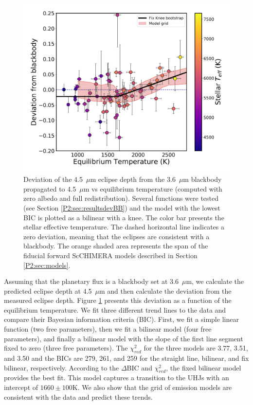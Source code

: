 \begin{figure}
    \centering
    \includegraphics[trim={0cm 0cm 0cm 0cm},clip,width=\linewidth]{devBBvsTeq_PHOENIX_intpl_fit+model_TiOVO_CO.pdf}
    \caption{Deviation of the 4.5~$\mu$m eclipse depth from the 3.6~$\mu$m blackbody propagated to 4.5~$\mu$m vs equilibrium temperature (computed with zero albedo and full redistribution). Several functions were tested (see Section \ref{P2:sec:resultsdevBB}) and  the model with the lowest BIC  is plotted as a bilinear with a knee. The color bar presents the stellar effective temperature. The dashed horizontal line indicates a zero deviation, meaning that the eclipses are consistent with a blackbody. The orange shaded area represents the span of the fiducial forward ScCHIMERA models described in Section \ref{P2:sec:models}.}
    \label{P2:fig:devBB}
\end{figure}

Assuming that the planetary flux is a blackbody set at 3.6~$\mu$m, we calculate the predicted eclipse depth at 4.5~$\mu$m and then calculate the deviation from the measured eclipse depth. Figure \ref{P2:fig:devBB} presents this deviation as a function of the equilibrium temperature. We fit three different trend lines to the data and compare their Bayesian information criteria (BIC). First, we fit a simple linear function (two free parameters), then we fit a bilinear model (four free parameters), and finally a bilinear model with the slope of the first line segment fixed to zero (three free parameters). The $\chi^2_{red}$ for the three models are 3.77, 3.51, and 3.50 and the BICs are 279, 261, and 259 for the straight line, bilinear, and fix bilinear, respectively. According to the $\Delta$BIC and $\chi^2_{red}$, the fixed bilinear model provides the best fit. This model captures a transition to the UHJs with an intercept of $1660\pm100$K. We also show that the grid of emission models are consistent with the data and predict these trends.


